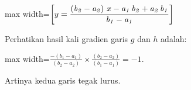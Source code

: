 \documentclass[a4paper,11pt,oneside,enabledeprecatedfontcommands]{scrbook}
\newenvironment{eulernotebook}{}{}
\newenvironment{eulercomment}{\par\medskip\noindent}{\par\medskip}
\newenvironment{eulerformula}{%
    \par\medskip\noindent
    \renewcommand{\[}{\begin{center}\begin{adjustbox}{max width=\textwidth}$\displaystyle}%
    \renewcommand{\]}{$\end{adjustbox}\end{center}}%
}{\par\medskip}
\begin{document}
\begin{eulernotebook}
\begin{eulerformula}
\[
\left[ y=\frac{\left({\it b_2}-{\it a_2}\right)\,x-{\it a_1}\,  {\it b_2}+{\it a_2}\,{\it b_1}}{{\it b_1}-{\it a_1}} \right] 
\]
\end{eulerformula}
\begin{eulercomment}
Perhatikan hasil kali gradien garis $g$ dan $h$ adalah:
\end{eulercomment}
\begin{eulerformula}
\[
\frac{-(b_1-a_1)}{(b_2-a_2)}\times \frac{(b_2-a_2)}{(b_1-a_1)} = -1.
\]
\end{eulerformula}
\begin{eulercomment}
Artinya kedua garis tegak lurus.
\end{eulercomment}


\end{eulernotebook}
\end{document}
